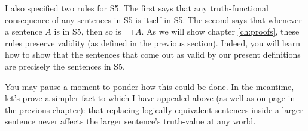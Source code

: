 
I also specified two rules for S5. The first says that any truth-functional
consequence of any sentences in S5 is itself in S5. The second says that
whenever a sentence $A$ is in S5, then so is $\Box A$. As we will show chapter
\ref{ch:proofs}, these rules preserve validity (as defined in the previous
section). Indeed, you will learn how to show that the sentences that come out as
valid by our present definitions are precisely the sentences in S5.

You may pause a moment to ponder how this could be done. In the meantime, let's
prove a simpler fact to which I have appealed above (as well as on page
\pageref{claim:replacement} in the previous chapter): that replacing logically
equivalent sentences inside a larger sentence never affects the larger
sentence's truth-value at any world.

